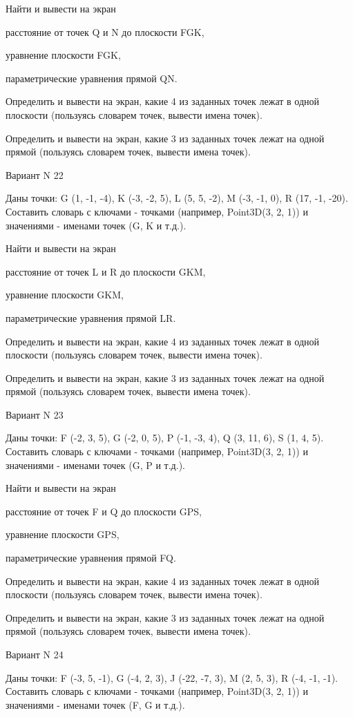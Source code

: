 \documentclass[11pt]{report}
\begin{document}
 
Найти и вывести на экран


расстояние от точек Q и N до плоскости FGK,

 
уравнение плоскости FGK,

 
параметрические уравнения прямой QN.


Определить и вывести на экран, какие 4 из заданных точек лежат в одной плоскости (пользуясь словарем точек, вывести имена точек).


Определить и вывести на экран, какие 3 из заданных точек лежат на одной прямой (пользуясь словарем точек, вывести имена точек).

Вариант N 22

Даны точки: G (1, -1, -4), K (-3, -2, 5), L (5, 5, -2), M (-3, -1, 0), R (17, -1, -20).
Составить словарь с ключами - точками (например, Point3D(3, 2, 1)) и значениями - именами точек (G, K и т.д.).

 
Найти и вывести на экран


расстояние от точек L и R до плоскости GKM,

 
уравнение плоскости GKM,

 
параметрические уравнения прямой LR.


Определить и вывести на экран, какие 4 из заданных точек лежат в одной плоскости (пользуясь словарем точек, вывести имена точек).


Определить и вывести на экран, какие 3 из заданных точек лежат на одной прямой (пользуясь словарем точек, вывести имена точек).

Вариант N 23

Даны точки: F (-2, 3, 5), G (-2, 0, 5), P (-1, -3, 4), Q (3, 11, 6), S (1, 4, 5).
Составить словарь с ключами - точками (например, Point3D(3, 2, 1)) и значениями - именами точек (G, P и т.д.).

 
Найти и вывести на экран


расстояние от точек F и Q до плоскости GPS,

 
уравнение плоскости GPS,

 
параметрические уравнения прямой FQ.


Определить и вывести на экран, какие 4 из заданных точек лежат в одной плоскости (пользуясь словарем точек, вывести имена точек).


Определить и вывести на экран, какие 3 из заданных точек лежат на одной прямой (пользуясь словарем точек, вывести имена точек).

Вариант N 24

Даны точки: F (-3, 5, -1), G (-4, 2, 3), J (-22, -7, 3), M (2, 5, 3), R (-4, -1, -1).
Составить словарь с ключами - точками (например, Point3D(3, 2, 1)) и значениями - именами точек (F, G и т.д.).
\end{document}
